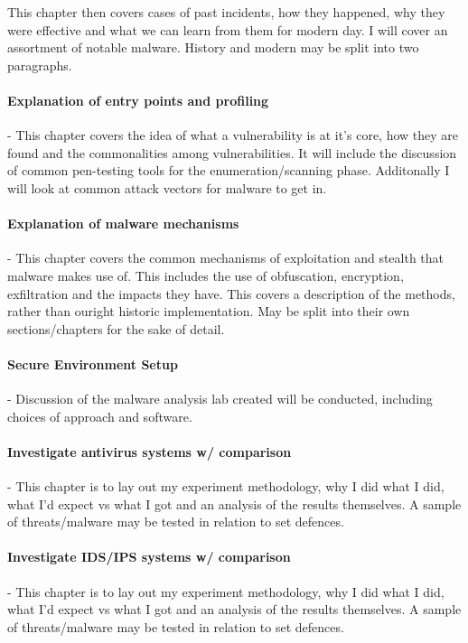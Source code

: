 This chapter then covers cases of past incidents, how they happened, why they were effective and what we can learn from them for modern day. 
I will cover an assortment of notable malware. History and modern may be split into two paragraphs.

\paragraph{Explanation of entry points and profiling} - This chapter covers the idea of what a vulnerability is at it's core, how they are found
and the commonalities among vulnerabilities. It will include the discussion of common pen-testing tools for the enumeration/scanning phase.
Additonally I will look at common attack vectors for malware to get in.

\paragraph{Explanation of malware mechanisms} - This chapter covers the common mechanisms of exploitation and stealth that malware makes use of. 
This includes the use of obfuscation, encryption, exfiltration and the impacts they have. This covers a description of the methods, rather than ouright historic implementation.
May be split into their own sections/chapters for the sake of detail.

\paragraph{Secure Environment Setup} - Discussion of the malware analysis lab created will be conducted, including choices of approach and software.

\paragraph{Investigate antivirus systems w/ comparison} - This chapter is to lay out my experiment methodology, why I did what I did, what I'd expect vs what I got and an analysis of the results themselves.  A sample of threats/malware may be tested in relation to set defences.

\paragraph{Investigate IDS/IPS systems w/ comparison} - This chapter is to lay out my experiment methodology, why I did what I did, what I'd expect vs what I got and an analysis of the results themselves. A sample of threats/malware may be tested in relation to set defences.

